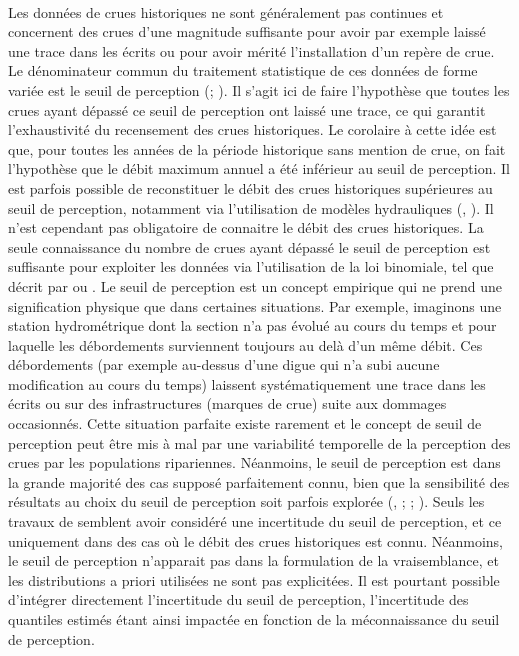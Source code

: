 \documentclass[11pt]{article}
\begin{document}
	\paragraph{} Les données de crues historiques ne sont généralement pas continues et concernent des crues d'une magnitude suffisante pour avoir par exemple laissé une trace dans les écrits ou pour avoir mérité l'installation d'un repère de crue. Le dénominateur commun du traitement statistique de ces données de forme variée est le seuil de perception (\citet{gerard_probability_1979}; \citet{stedinger_flood_1986}). Il s'agit ici de faire l'hypothèse que toutes les crues ayant dépassé ce seuil de perception ont laissé une trace, ce qui garantit l'exhaustivité du recensement des crues historiques. Le corolaire à cette idée est que, pour toutes les années de la période historique sans mention de crue, on fait l'hypothèse que le débit maximum annuel a été inférieur au seuil de perception. Il est parfois possible de reconstituer le débit des crues historiques supérieures au seuil de perception, notamment via l'utilisation de modèles hydrauliques (\citet{neppel_flood_2010}, \citet{machado_flood_2015}). Il n'est cependant pas obligatoire de connaitre le débit des crues historiques. La seule connaissance du nombre de crues ayant dépassé le seuil de perception est suffisante pour exploiter les données via l'utilisation de la loi binomiale, tel que décrit par \citet{stedinger_flood_1986} ou \citet{payrastre_usefulness_2011}. Le seuil de perception est un concept empirique qui ne prend une signification physique que dans certaines situations. Par exemple, imaginons une station hydrométrique dont la section n'a pas évolué au cours du temps et pour laquelle les débordements surviennent toujours au delà d'un même débit. Ces débordements (par exemple au-dessus d'une digue qui n'a subi aucune modification au cours du temps) laissent systématiquement une trace dans les écrits ou sur des infrastructures (marques de crue) suite aux dommages occasionnés. Cette situation parfaite existe rarement et le concept de seuil de perception peut être mis à mal par une variabilité temporelle de la perception des crues par les populations ripariennes. Néanmoins, le seuil de perception est dans la grande majorité des cas supposé parfaitement connu, bien que la sensibilité des résultats au choix du seuil de perception soit parfois explorée (\citet{stedinger_flood_1986}, \citet{viglione_flood_2013}; \citet{macdonald_reassessing_2014}; \citet{payrastre_usefulness_2011}). Seuls les travaux de \citet{parkes_defining_2016} semblent avoir considéré une incertitude du seuil de perception, et ce uniquement dans des cas où le débit des crues historiques est connu. Néanmoins, le seuil de perception n'apparait pas dans la formulation de la vraisemblance, et les distributions a priori utilisées ne sont pas explicitées. Il est pourtant possible d'intégrer directement l'incertitude du seuil de perception, l'incertitude des quantiles estimés étant ainsi impactée en fonction de la méconnaissance du seuil de perception. 
\end{document}
